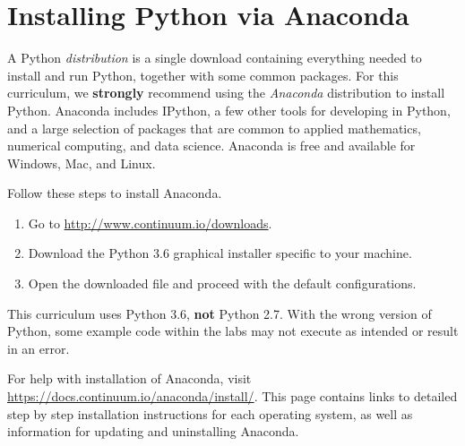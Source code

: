 \label{pythoninstall}


\section*{Installing Python via Anaconda} %




A Python \emph{distribution} is a single download containing everything needed to install and run Python, together with some common packages.
For this curriculum, we \textbf{strongly} recommend using the \emph{Anaconda} distribution to install Python.
Anaconda includes IPython, a few other tools for developing in Python, and a large selection of packages that are common to applied mathematics, numerical computing, and data science.
Anaconda is free and available for Windows, Mac, and Linux.

Follow these steps to install Anaconda.
\begin{enumerate}
\item Go to \url{http://www.continuum.io/downloads}.
\item Download the Python 3.6 graphical installer specific to your machine.
\item Open the downloaded file and proceed with the default configurations.
\end{enumerate}

\begin{warn}
This curriculum uses Python 3.6, \textbf{not} Python 2.7.
With the wrong version of Python, some example code within the labs may not execute as intended or result in an error.
\end{warn}

For help with installation of Anaconda, visit \url{https://docs.continuum.io/anaconda/install/}. This page contains links to detailed step by step installation instructions for each operating system, as well as information for updating and uninstalling Anaconda.

